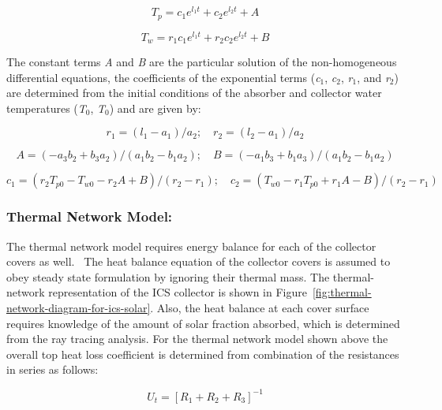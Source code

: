\begin{equation}
{T_p} =  {c_1}{e^{{l_1}t}} + {c_2}{e^{{l_2}t}} + A
\end{equation}

\begin{equation}
{T_w} =  {r_1}{c_1}{e^{{l_1}t}} + {r_2}{c_2}{e^{{l_2}t}} + B
\end{equation}

The constant terms \emph{A} and \emph{B} are the particular solution of the non-homogeneous differential equations, the coefficients of the exponential terms (\emph{c\(_{1}\)}, \emph{c\(_{2}\)}, \emph{r\(_{1}\)}, and \emph{r\(_{2}\)}) are determined from the initial conditions of the absorber and collector water temperatures (\emph{T\(_{0}\)}, \emph{T\(_{0}\)}) and are given by:

\begin{equation}
{r_1} =  ({l_1} - {a_1})/{a_2};\quad {r_2} =  ({l_2} - {a_1})/{a_2}
\end{equation}

\begin{equation}
A =  ( - {a_3}{b_2} + {b_3}{a_2})/({a_1}{b_2} - {b_1}{a_2});\quad B =  ( - {a_1}{b_3} + {b_1}{a_3})/({a_1}{b_2} - {b_1}{a_2})
\end{equation}

\begin{equation}
{c_1} =  ({r_2}{T_{p0}} - {T_{w0}} - {r_2}A + B)/({r_2} - {r_1});\quad {c_2} =  ({T_{w0}} - {r_1}{T_{p0}} + {r_1}A - B)/({r_2} - {r_1})
\end{equation}

\subsubsection{Thermal Network Model:}\label{thermal-network-model}

The thermal network model requires energy balance for each of the collector covers as well.~ The heat balance equation of the collector covers is assumed to obey steady state formulation by ignoring their thermal mass. The thermal-network representation of the ICS collector is shown in Figure~\ref{fig:thermal-network-diagram-for-ics-solar}. Also, the heat balance at each cover surface requires knowledge of the amount of solar fraction absorbed, which is determined from the ray tracing analysis. For the thermal network model shown above the overall top heat loss coefficient is determined from combination of the resistances in series as follows:

\begin{equation}
{U_t} = {\left[ {{R_1} + {R_2} + {R_3}} \right]^{ - 1}}
\end{equation}

